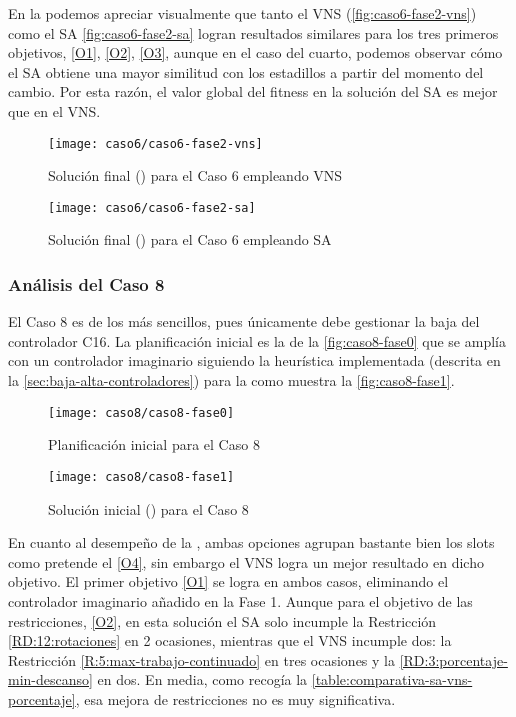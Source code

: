 En la \fasedos{} podemos apreciar visualmente que tanto el VNS (\autoref{fig:caso6-fase2-vns}) como el SA \autoref{fig:caso6-fase2-sa} logran resultados similares para los tres primeros objetivos, \ref{O1}, \ref{O2}, \ref{O3}, aunque en el caso del cuarto, podemos observar cómo el SA obtiene una mayor similitud con los estadillos a partir del momento del cambio. Por esta razón, el valor global del fitness en la solución del SA es mejor que en el VNS.

\begin{figure}[!]
	\centering
	\texttt{[image: caso6/caso6-fase2-vns]}
	\caption{Solución final (\fasedos{}) para el Caso 6 empleando VNS}
	\label{fig:caso6-fase2-vns}
\end{figure}

\begin{figure}[!]
	\centering
	\texttt{[image: caso6/caso6-fase2-sa]}
	\caption{Solución final (\fasedos{}) para el Caso 6 empleando SA}
	\label{fig:caso6-fase2-sa}
\end{figure}

\subsubsection{Análisis del Caso 8}

El Caso 8 es de los más sencillos, pues únicamente debe gestionar la baja del controlador C16. La planificación inicial es la de la \autoref{fig:caso8-fase0} que se amplía con un controlador imaginario siguiendo la heurística implementada (descrita en la \autoref{sec:baja-alta-controladores}) para la \faseuno{} como muestra la \autoref{fig:caso8-fase1}. 

\begin{figure}[!]
	\centering
	\texttt{[image: caso8/caso8-fase0]}
	\caption{Planificación inicial para el Caso 8}
	\label{fig:caso8-fase0}
\end{figure}

\begin{figure}[!]
	\centering
	\texttt{[image: caso8/caso8-fase1]}
	\caption{Solución inicial (\faseuno{}) para el Caso 8}
	\label{fig:caso8-fase1}
\end{figure}

En cuanto al desempeño de la \fasedos{}, ambas opciones agrupan bastante bien los slots como pretende el \ref{O4}, sin embargo el VNS logra un mejor resultado en dicho objetivo. El primer objetivo \ref{O1} se logra en ambos casos, eliminando el controlador imaginario añadido en la Fase 1. Aunque para el objetivo de las restricciones, \ref{O2}, en esta solución el SA solo incumple la Restricción \ref{RD:12:rotaciones} en 2 ocasiones, mientras que el VNS incumple dos: la Restricción \ref{R:5:max-trabajo-continuado} en tres ocasiones y la \ref{RD:3:porcentaje-min-descanso} en dos.
En media, como recogía la \autoref{table:comparativa-sa-vns-porcentaje}, esa mejora de restricciones no es muy significativa.


